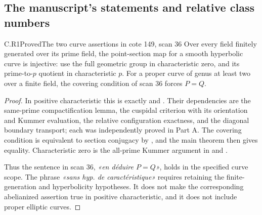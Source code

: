 \subsection{The manuscript's statements and relative class numbers}

\begin{claim}{C.R1}{Proved}{The two curve assertions in cote 149, scan 36}
Over every field finitely generated over its prime field, the
point-section map for a smooth hyperbolic curve is injective:
use the full geometric group in characteristic zero, and its
prime-to-$p$ quotient in characteristic $p$. For a proper curve
of genus at least two over a finite field, the covering condition
of scan 36 forces $P=Q$.
\end{claim}
\begin{proof}
In positive characteristic this is exactly
 and . Their dependencies
are the same-prime compactification lemma, the cuspidal criterion
with its orientation and Kummer evaluation, the relative
configuration exactness, and the diagonal boundary transport;
each was independently proved in Part A. The covering condition
is equivalent to section conjugacy by , and
the main theorem then gives equality. Characteristic zero is the
all-prime Kummer argument in  and
.

Thus the sentence in scan 36, \emph{«en déduire $P=Q$»}, holds in
the specified curve scope. The phrase
\emph{«sans hyp. de caractéristique»} requires retaining the
finite-generation and hyperbolicity hypotheses. It does not make
the corresponding abelianized assertion true in positive
characteristic, and it does not include proper elliptic curves.
\end{proof}

